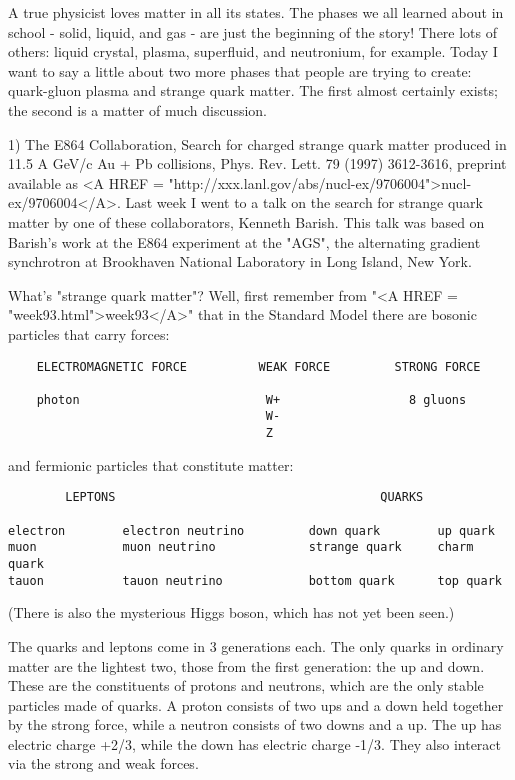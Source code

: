 


A true physicist loves matter in all its states.  The phases we all
learned about in school - solid, liquid, and gas - are just the
beginning of the story!  There lots of others: liquid crystal, plasma,
superfluid, and neutronium, for example.  Today I want to say a little
about two more phases that people are trying to create: quark-gluon
plasma and strange quark matter.  The first almost certainly exists;
the second is a matter of much discussion.

1) The E864 Collaboration, Search for charged strange quark matter
produced in 11.5 A GeV/c Au + Pb collisions, Phys. Rev. Lett. 79 (1997)
3612-3616, preprint available as 
<A HREF = "http://xxx.lanl.gov/abs/nucl-ex/9706004">nucl-ex/9706004</A>.
Last week I went to a talk on the search for strange quark matter by
one of these collaborators, Kenneth Barish.  This talk was based on
Barish's work at the E864 experiment at the "AGS", the alternating
gradient synchrotron at Brookhaven National Laboratory in Long Island,
New York.

What's "strange quark matter"?  Well, first remember from "<A HREF = "week93.html">week93</A>" that
in the Standard Model there are bosonic particles that carry forces:

\begin{verbatim}
    ELECTROMAGNETIC FORCE          WEAK FORCE         STRONG FORCE
        
    photon                          W+                  8 gluons 
                                    W-
                                    Z  
\end{verbatim}
    
and fermionic particles that constitute matter:
      
\begin{verbatim}
        LEPTONS                                     QUARKS

electron        electron neutrino         down quark        up quark
muon            muon neutrino             strange quark     charm quark
tauon           tauon neutrino            bottom quark      top quark
\end{verbatim}
    
(There is also the mysterious Higgs boson, which has not yet been seen.)

The quarks and leptons come in 3 generations each.  The only quarks in
ordinary matter are the lightest two, those from the first generation:
the up and down.  These are the constituents of protons and neutrons,
which are the only stable particles made of quarks.  A proton consists
of two ups and a down held together by the strong force, while a neutron
consists of two downs and a up.  The up has electric charge +2/3, while
the down has electric charge -1/3.  They also interact via the strong
and weak forces.

